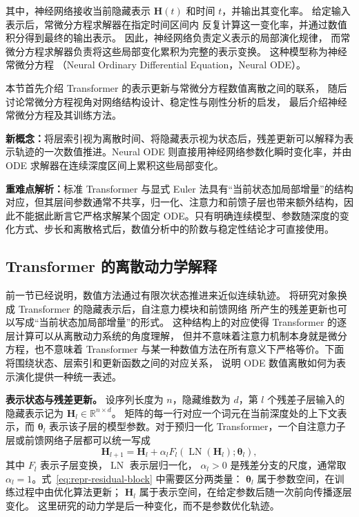 \documentclass[UTF8,a4paper,zihao=-4,oneside,openany]{ctexbook}
\begin{document}
其中，神经网络接收当前隐藏表示
\(\boldsymbol{H}(t)\)
和时间 \(t\)，并输出其变化率。
给定输入表示后，常微分方程求解器在指定时间区间内
反复计算这一变化率，并通过数值积分得到最终的输出表示。
因此，神经网络负责定义表示的局部演化规律，
而常微分方程求解器负责将这些局部变化累积为完整的表示变换。
这种模型称为神经常微分方程
（Neural Ordinary Differential Equation，Neural ODE）。

本节首先介绍 Transformer 的表示更新与常微分方程数值离散之间的联系，
随后讨论常微分方程视角对网络结构设计、稳定性与刚性分析的启发，
最后介绍神经常微分方程及其训练方法。

\begin{importantnote}
\textbf{新概念：}将层索引视为离散时间、将隐藏表示视为状态后，残差更新可以解释为表示轨迹的一次数值推进。Neural ODE 则直接用神经网络参数化瞬时变化率，并由 ODE 求解器在连续深度区间上累积这些局部变化。

\textbf{重难点解析：}标准 Transformer 与显式 Euler 法具有“当前状态加局部增量”的结构对应，但其层间参数通常不共享，归一化、注意力和前馈子层也带来额外结构，因此不能据此断言它严格求解某个固定 ODE。只有明确连续模型、参数随深度的变化方式、步长和离散格式后，数值分析中的阶数与稳定性结论才可直接使用。
\end{importantnote}

\subsection{Transformer 的离散动力学解释}

前一节已经说明，数值方法通过有限次状态推进来近似连续轨迹。
将研究对象换成 Transformer 的隐藏表示后，自注意力模块和前馈网络
所产生的残差更新也可以写成“当前状态加局部增量”的形式。
这种结构上的对应使得 Transformer 的逐层计算可以从离散动力系统的角度理解，
但并不意味着注意力机制本身就是微分方程，也不意味着 Transformer
与某一种数值方法在所有意义下严格等价。下面将围绕状态、层索引和更新函数之间的对应关系，
说明 ODE 数值离散如何为表示演化提供一种统一表述。

\textbf{表示状态与残差更新。}
设序列长度为 \(n\)，隐藏维数为 \(d\)，第 \(l\) 个残差子层输入的
隐藏表示记为
\(\boldsymbol{H}_{l}\in\mathbb{R}^{n\times d}\)。
矩阵的每一行对应一个词元在当前深度处的上下文表示，而
\(\boldsymbol{\theta}_{l}\) 表示该子层的模型参数。对于预归一化
Transformer，一个自注意力子层或前馈网络子层都可以统一写成
\begin{equation}
    \boldsymbol{H}_{l+1}
    =
    \boldsymbol{H}_{l}
    +
    \alpha_l
    F_l\!\left(
        \operatorname{LN}(\boldsymbol{H}_{l});
        \boldsymbol{\theta}_{l}
    \right),
    \label{eq:repr-residual-block}
\end{equation}
其中 \(F_l\) 表示子层变换，\(\operatorname{LN}\) 表示层归一化，
\(\alpha_l>0\) 是残差分支的尺度，通常取
\(\alpha_l=1\)。式~\eqref{eq:repr-residual-block} 中需要区分两类量：
\(\boldsymbol{\theta}_{l}\) 属于参数空间，在训练过程中由优化算法更新；
\(\boldsymbol{H}_{l}\) 属于表示空间，在给定参数后随一次前向传播逐层变化。
这里研究的动力学是后一种变化，而不是参数优化轨迹。
\end{document}
